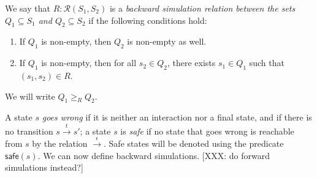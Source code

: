 \documentclass[sigplan,10pt,review,anonymous]{acmart}
\newcommand{\kw}[1]{\ensuremath{ \mathsf{#1} }}
\begin{document}
\begin{definition}
We say that $R : \mathcal{R}(S_1, S_2)$ is a
\emph{backward simulation relation
  between the sets $Q_1 \subseteq S_1$ and  $Q_2 \subseteq S_2$}
if the following conditions hold:
\begin{enumerate}
\item
  If $Q_1$ is non-empty,
  then $Q_2$ is non-empty as well.
\item
  If $Q_1$ is non-empty,
  then for all $s_2 \in Q_2$,
  there exists $s_1 \in Q_1$
  such that $(s_1, s_2) \in R$.
\end{enumerate}
We will write $Q_1 \ge_R Q_2$.
\end{definition}

A state $s$ \emph{goes wrong}
if it is neither an interaction nor a final state,
and if there is no transition $s \stackrel{t}{\rightarrow} s'$;
a state $s$ is \emph{safe}
if no state that goes wrong is reachable from $s$
by the relation $\stackrel{\epsilon}{\rightarrow}$.
Safe states will be denoted using the predicate $\kw{safe}(s)$.
We can now define backward simulations.
[XXX: do forward simulations instead?]
\end{document}
